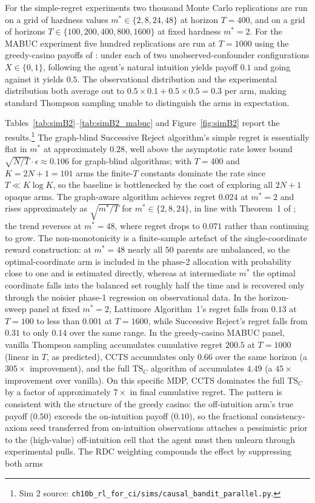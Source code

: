 For the simple-regret experiments two thousand Monte Carlo replications are run on a grid of hardness values $m^* \in \{2, 8, 24, 48\}$ at horizon $T = 400$, and on a grid of horizons $T \in \{100, 200, 400, 800, 1600\}$ at fixed hardness $m^* = 2$. For the MABUC experiment five hundred replications are run at $T = 1000$ using the greedy-casino payoffs of \citet[Table~1]{bareinboim2015mabuc}: under each of two unobserved-confounder configurations $X \in \{0, 1\}$, following the agent's natural intuition yields payoff $0.1$ and going against it yields $0.5$. The observational distribution and the experimental distribution both average out to $0.5 \times 0.1 + 0.5 \times 0.5 = 0.3$ per arm, making standard Thompson sampling unable to distinguish the arms in expectation.

Tables~\ref{tab:simB2}--\ref{tab:simB2_mabuc} and Figure~\ref{fig:simB2} report the results.\footnote{Sim 2 source: \texttt{ch10b\_rl\_for\_ci/sims/causal\_bandit\_parallel.py}.} The graph-blind Successive Reject algorithm's simple regret is essentially flat in $m^*$ at approximately $0.28$, well above the asymptotic rate lower bound $\sqrt{N/T} \cdot \epsilon \approx 0.106$ for graph-blind algorithms; with $T = 400$ and $K = 2N+1 = 101$ arms the finite-$T$ constants dominate the rate since $T \ll K \log K$, so the baseline is bottlenecked by the cost of exploring all $2N + 1$ opaque arms. The graph-aware algorithm achieves regret $0.024$ at $m^* = 2$ and rises approximately as $\sqrt{m^*/T}$ for $m^* \in \{2, 8, 24\}$, in line with Theorem~1 of \citet{lattimore2016causal}; the trend reverses at $m^* = 48$, where regret drops to $0.071$ rather than continuing to grow. The non-monotonicity is a finite-sample artefact of the single-coordinate reward construction: at $m^* = 48$ nearly all $50$ parents are unbalanced, so the optimal-coordinate arm is included in the phase-2 allocation with probability close to one and is estimated directly, whereas at intermediate $m^*$ the optimal coordinate falls into the balanced set roughly half the time and is recovered only through the noisier phase-1 regression on observational data. In the horizon-sweep panel at fixed $m^* = 2$, Lattimore Algorithm~1's regret falls from $0.13$ at $T = 100$ to less than $0.001$ at $T = 1600$, while Successive Reject's regret falls from $0.31$ to only $0.14$ over the same range. In the greedy-casino MABUC panel, vanilla Thompson sampling accumulates cumulative regret $200.5$ at $T = 1000$ (linear in $T$, as predicted), CCTS accumulates only $0.66$ over the same horizon (a $305\times$ improvement), and the full $\mathrm{TS}_C$ algorithm of \citet{bareinboim2015mabuc} accumulates $4.49$ (a $45\times$ improvement over vanilla). On this specific MDP, CCTS dominates the full $\mathrm{TS}_C$ by a factor of approximately $7\times$ in final cumulative regret. The pattern is consistent with the structure of the greedy casino: the off-intuition arm's true payoff ($0.50$) exceeds the on-intuition payoff ($0.10$), so the fractional consistency-axiom seed transferred from on-intuition observations attaches a pessimistic prior to the (high-value) off-intuition cell that the agent must then unlearn through experimental pulls. The RDC weighting compounds the effect by suppressing both arms 